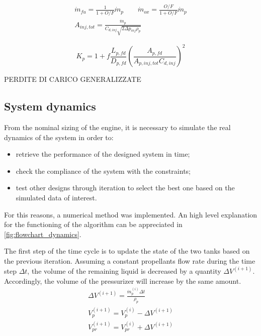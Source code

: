 \begin{gather}
    \dot{m}_{fu} = \frac{1}{1 + O/F}\dot{m}_p \qquad \dot{m}_{ox} = \frac{O/F}{1 + O/F}\dot{m}_p
    \\
    A_{inj,tot} = \frac{\dot{m}_p}{C_{d,inj} \sqrt{2\Delta p_{inj} \rho_p}} 
\end{gather}
   
\begin{equation}
    K_{p} = 1 + f \frac{L_{p,fd}}{D_{p,fd}} \left(\frac{A_{p, fd}}{A_{p,inj, tot}C_{d,inj}}\right)^2
    \label{eq:K}
\end{equation}

PERDITE DI CARICO GENERALIZZATE
 
\subsection{System dynamics}
\label{subsec:dynamics}

From the nominal sizing of the engine, it is necessary to simulate the real dynamics of the system in order to:

\begin{itemize}
    \item retrieve the performance of the designed system in time;
    \item check the compliance of the system with the constraints;
    \item test other designs through iteration to select the best one based on the simulated data of interest.
\end{itemize}

For this reasons, a numerical method was implemented. An high level explanation for the functioning of the algorithm can be appreciated in \autoref{fig:flowchart_dynamics}.


The first step of the time cycle is to update the state of the two tanks based on the previous iteration. Assuming a constant propellants flow rate during the time step $\Delta t$, the volume of the remaining liquid is decreased by a quantity $\Delta V ^ {(i+1)}$. Accordingly, the volume of the pressurizer will increase by the same amount.
\begin{gather}
    \Delta V ^ {(i+1)} = \frac{\dot{m}_p^{(i)} \Delta t}{\rho_p} \\
    V_p ^ {(i+1)} = V_p ^ {(i)} - \Delta V ^ {(i+1)} \\
    V_{pr} ^ {(i+1)} = V_{pr} ^ {(i)} + \Delta V ^ {(i+1)}
\end{gather}

